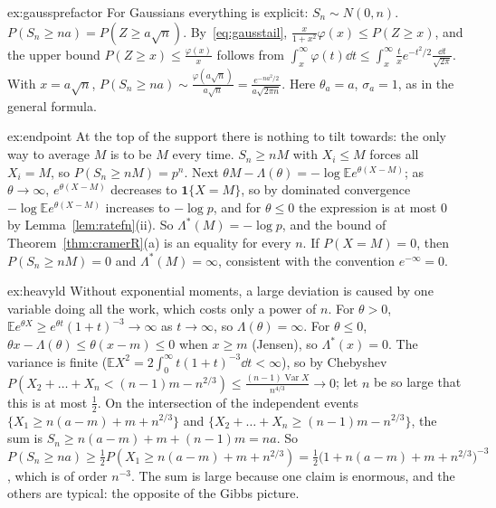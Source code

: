 \begin{solution}{ex:gaussprefactor}
\idea For Gaussians everything is explicit: $S_n\sim N(0,n)$.
\writeup $P(S_n\ge na)=P(Z\ge a\sqrt n)$. By~\eqref{eq:gausstail}, $\frac{x}{1+x^2}\varphi(x)\le P(Z\ge x)$, and the upper bound $P(Z\ge x)\le\frac{\varphi(x)}x$ follows from
$\int_x^\infty\varphi(t)\dd t\le\int_x^\infty\frac txe^{-t^2/2}\frac{\dd t}{\sqrt{2\pi}}$. With $x=a\sqrt n$, $P(S_n\ge na)\sim\frac{\varphi(a\sqrt n)}{a\sqrt n}=\frac{e^{-na^2/2}}{a\sqrt{2\pi n}}$. Here $\theta_a=a$,
$\sigma_a=1$, as in the general formula.
\end{solution}

\begin{solution}{ex:endpoint}
\idea At the top of the support there is nothing to tilt towards: the only way to average $M$ is to be $M$ every time.
\writeup $S_n\ge nM$ with $X_i\le M$ forces all $X_i=M$, so $P(S_n\ge nM)=p^n$. Next $\theta M-\Lambda(\theta)=-\log\mathbb Ee^{\theta(X-M)}$; as $\theta\to\infty$, $e^{\theta(X-M)}$ decreases to
$\mathbf 1\{X=M\}$, so by dominated convergence $-\log\mathbb Ee^{\theta(X-M)}$ increases to $-\log p$, and for $\theta\le0$ the expression is at most $0$ by Lemma~\ref{lem:ratefn}(ii). So
$\Lambda^*(M)=-\log p$, and the bound of Theorem~\ref{thm:cramerR}(a) is an equality for every $n$. If $P(X=M)=0$, then $P(S_n\ge nM)=0$ and $\Lambda^*(M)=\infty$, consistent with the convention $e^{-\infty}=0$.
\end{solution}

\begin{solution}{ex:heavyld}
\idea Without exponential moments, a large deviation is caused by one variable doing all the work, which costs only a power of $n$.
\writeup For $\theta>0$, $\mathbb Ee^{\theta X}\ge e^{\theta t}(1+t)^{-3}\to\infty$ as $t\to\infty$, so $\Lambda(\theta)=\infty$. For $\theta\le0$, $\theta x-\Lambda(\theta)\le\theta(x-m)\le0$ when $x\ge m$ (Jensen), so $\Lambda^*(x)=0$.
The variance is finite ($\mathbb EX^2=2\int_0^\infty t(1+t)^{-3}\dd t<\infty$), so by Chebyshev $P(X_2+\dots+X_n<(n-1)m-n^{2/3})\le\frac{(n-1)\operatorname{Var}X}{n^{4/3}}\to0$; let $n$ be so
large that this is at most $\frac12$. On the intersection of the independent events $\{X_1\ge n(a-m)+m+n^{2/3}\}$ and $\{X_2+\dots+X_n\ge(n-1)m-n^{2/3}\}$, the sum is
$S_n\ge n(a-m)+m+(n-1)m=na$. So $P(S_n\ge na)\ge\frac12P(X_1\ge n(a-m)+m+n^{2/3})=\frac12\bigl(1+n(a-m)+m+n^{2/3}\bigr)^{-3}$, which is of order $n^{-3}$. The sum is large because one claim is enormous, and the others are
typical: the opposite of the Gibbs picture.
\end{solution}

